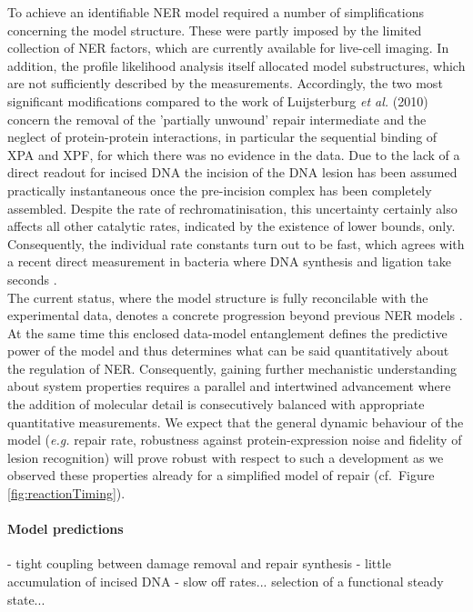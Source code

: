 To achieve an identifiable NER model required a number of simplifications concerning the model structure. These were partly imposed by the limited collection of NER factors, which are currently available for live-cell imaging. In addition, the profile likelihood analysis itself allocated model substructures, which are not sufficiently described by the measurements. Accordingly, the two most significant modifications compared to the work of Luijsterburg \textit{et al.} (2010) \cite{Luijsterburg2010} concern the removal of the 'partially unwound' repair intermediate and the neglect of protein-protein interactions, in particular the sequential binding of XPA and XPF, for which there was no evidence in the data. Due to the lack of a direct readout for incised DNA the incision of the DNA lesion has been assumed practically instantaneous once the pre-incision complex has been completely assembled. Despite the rate of rechromatinisation, this uncertainty certainly also affects all other catalytic rates, indicated by the existence of lower bounds, only. Consequently, the individual rate constants turn out to be fast, which agrees with a recent direct measurement in bacteria where DNA synthesis and ligation take seconds \cite{Uphoff2013}. \\
The current status, where the model structure is fully reconcilable with the experimental data, denotes a concrete progression beyond previous NER models \cite{Luijsterburg2010,Politi2005,Kesseler2007}. At the same time this enclosed data-model entanglement defines the predictive power of the model and thus determines what can be said quantitatively about the regulation of NER. Consequently, gaining further mechanistic understanding about system properties requires a parallel and intertwined advancement where the addition of molecular detail is consecutively balanced with appropriate quantitative measurements. We expect that the general dynamic behaviour of the model (\textit{e.g.} repair rate, robustness against protein-expression noise and fidelity of lesion recognition) will prove robust with respect to such a development as we observed these properties already for a simplified model of repair (cf.\ Figure \ref{fig:reactionTiming}).    
       
    

 





\paragraph{Model predictions}
- tight coupling between damage removal and repair synthesis
- little accumulation of incised DNA
- slow off rates... selection of a functional steady state...

